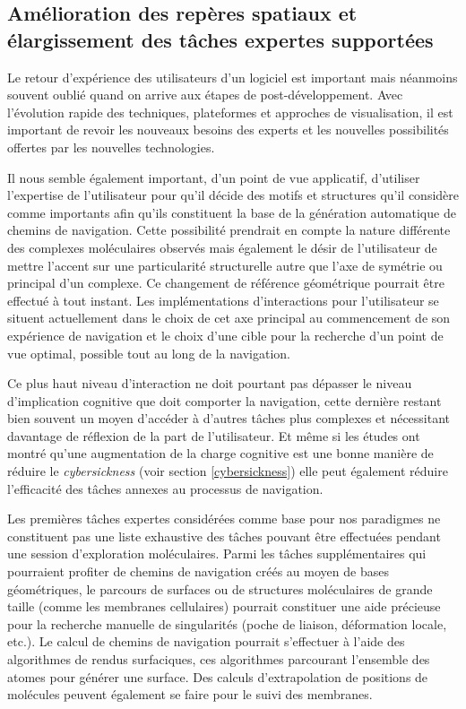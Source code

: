 \subsection*{Amélioration des repères spatiaux et élargissement des tâches expertes supportées}

Le retour d'expérience des utilisateurs d'un logiciel est important mais néanmoins souvent oublié quand on arrive aux étapes de post-développement. Avec l'évolution rapide des techniques, plateformes et approches de visualisation, il est important de revoir les nouveaux besoins des experts et les nouvelles possibilités offertes par les nouvelles technologies. 

Il nous semble également important, d'un point de vue applicatif, d'utiliser l'expertise de l'utilisateur pour qu'il décide des motifs et structures qu'il considère comme importants afin qu'ils constituent la base de la génération automatique de chemins de navigation. Cette possibilité prendrait en compte la nature différente des complexes moléculaires observés mais également le désir de l'utilisateur de mettre l'accent sur une particularité structurelle autre que l'axe de symétrie ou principal d'un complexe. Ce changement de référence géométrique pourrait être effectué à tout instant.
Les implémentations d'interactions pour l'utilisateur se situent actuellement dans le choix de cet axe principal au commencement de son expérience de navigation et le choix d'une cible pour la recherche d'un point de vue optimal, possible tout au long de la navigation. 

Ce plus haut niveau d'interaction ne doit pourtant pas dépasser le niveau d'implication cognitive que doit comporter la navigation, cette dernière restant bien souvent un moyen d'accéder à d'autres tâches plus complexes et nécessitant davantage de réflexion de la part de l'utilisateur. Et même si les études ont montré qu'une augmentation de la charge cognitive est une bonne manière de réduire le \textit{cybersickness} (voir section \ref{cybersickness}) elle peut également réduire l'efficacité des tâches annexes au processus de navigation.

Les premières tâches expertes considérées comme base pour nos paradigmes ne constituent pas une liste exhaustive des tâches pouvant être effectuées pendant une session d'exploration moléculaires. Parmi les tâches supplémentaires qui pourraient profiter de chemins de navigation créés au moyen de bases géométriques, le parcours de surfaces ou de structures moléculaires de grande taille (comme les membranes cellulaires) pourrait constituer une aide précieuse pour la recherche manuelle de singularités (poche de liaison, déformation locale, etc.). Le calcul de chemins de navigation pourrait s'effectuer à l'aide des algorithmes de rendus surfaciques, ces algorithmes parcourant l'ensemble des atomes pour générer une surface. Des calculs d'extrapolation de positions de molécules peuvent également se faire pour le suivi des membranes.

